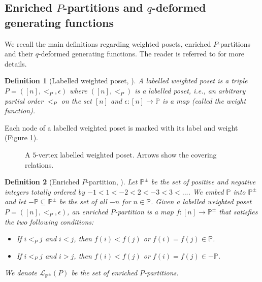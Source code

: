 \documentclass[submission]{FPSAC2023}
\newtheorem{defn}{Definition}
\newcommand{\PP}{\mathbb{P}} %
\begin{document}
\subsection{Enriched $P$-partitions and $q$-deformed generating functions}
\label{sec : poset}
We recall the main definitions regarding weighted posets, enriched $P$-partitions and their $q$-deformed generating functions. The reader is referred to \cite{Ges84, GriVas21, GriVas22, Sta01, Ste97} for more details.   
\begin{defn}[Labelled weighted poset, \cite{GriVas21}]
A \emph{labelled weighted poset} is a triple $P = ([n],<_P,\epsilon)$ where $([n], <_P)$ is a \emph{labelled poset}, i.e., an arbitrary partial order $ <_P$ on the set $[n]$ and $\epsilon : [n]\longrightarrow \PP$ is a map (called the \emph{weight function}).
\end{defn}
\noindent Each node of a labelled weighted poset is marked with its label and weight (Figure \ref{fig : poset}).
%
\begin{figure}[htbp]
\begin{center}
\end{center}
\caption{A $5$-vertex labelled weighted poset. Arrows show the covering relations.}
 \label{fig : poset}
 \end{figure}
 \begin{defn}[Enriched $P$-partition, \cite{Ste97}]\label{def : enriched}
Let $\PP^{\pm}$ be the set of positive and negative integers totally ordered by $-1<1<-2<2<-3<3<\dots$. We embed $\PP$ into $\PP^{\pm}$ and let $-\PP \subseteq \PP^{\pm}$ be the set of all $-n$ for $n \in \PP$. Given a labelled weighted poset $P = ([n],<_P,\epsilon)$, an \emph{enriched $P$-partition} is a map $f: [n]\longrightarrow \PP^{\pm} $ that satisfies the two following conditions:
\begin{itemize}
\item[(i)] If $i <_P j$ and $i < j$, then $f(i) < f(j)$ or $f(i) = f(j) \in \PP$.
\item[(ii)] If $i <_P j$ and $i>j$, then $f(i) < f(j)$ or $f(i) = f(j) \in -\PP$.
\end{itemize}
We denote $\mathcal{L}_{\PP^{\pm}}(P)$ be the set of enriched $P$-partitions.
\end{defn} 
\end{document}
